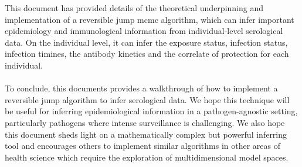 This document has provided details of the theoretical underpinning and implementation of a reversible jump mcmc algorithm, which can infer important epidemiology and immunological information from individual-level serological data. On the individual level, it can infer the exposure status, infection status, infection timines, the antibody kinetics and the correlate of protection for each individual.
\paragraph{}To conclude, this documents provides a walkthrough of how to implement a reversible jump algorithm to infer serological data. We hope this technique will be useful for inferring epidemiological information in a pathogen-agnostic setting, particularly pathogens where intense surveillance is challenging. We also hope this document sheds light on a mathematically complex but powerful inferring tool and encourages others to implement similar algorithms in other areas of health science which require the exploration of multidimensional model spaces. 
